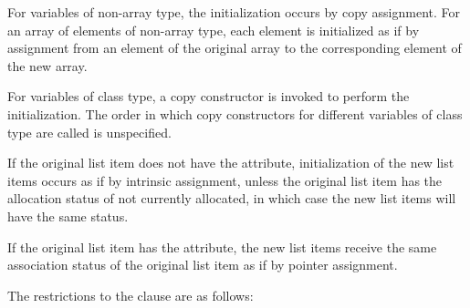 \ccppspecificstart
For variables of non-array type, the initialization occurs by copy assignment. For an 
array of elements of non-array type, each element is initialized as if by assignment from 
an element of the original array to the corresponding element of the new array. 
\ccppspecificend

\cppspecificstart
For variables of class type, a copy constructor is invoked to perform the initialization. 
The order in which copy constructors for different variables of class type are called is 
unspecified. 
\cppspecificend

\fortranspecificstart
If the original list item does not have the  attribute, initialization of the new 
list items occurs as if by intrinsic assignment, unless the original list item has the 
allocation status of not currently allocated, in which case the new list items will have the 
same status.

If the original list item has the  attribute, the new list items receive the same 
association status of the original list item as if by pointer assignment.
\fortranspecificend

\restrictions
The restrictions to the  clause are as follows:

